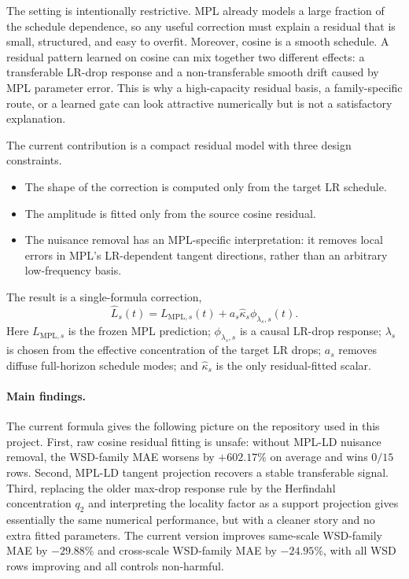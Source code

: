 \documentclass{article}
\newcommand{\MPL}{\mathrm{MPL}}
\begin{document}
The setting is intentionally restrictive.  MPL already models a large fraction of the
schedule dependence, so any useful correction must explain a residual that is small,
structured, and easy to overfit.  Moreover, cosine is a smooth schedule.  A residual pattern
learned on cosine can mix together two different effects: a transferable LR-drop response and
a non-transferable smooth drift caused by MPL parameter error.  This is why a high-capacity
residual basis, a family-specific route, or a learned gate can look attractive numerically but
is not a satisfactory explanation.

The current contribution is a compact residual model with three design constraints.
\begin{itemize}\itemsep2pt
  \item The shape of the correction is computed only from the target LR schedule.
  \item The amplitude is fitted only from the source cosine residual.
  \item The nuisance removal has an MPL-specific interpretation: it removes local errors in
  MPL's LR-dependent tangent directions, rather than an arbitrary low-frequency basis.
\end{itemize}

The result is a single-formula correction,
\begin{equation}\label{eq:main_law}
  \widehat L_s(t)=L_{\MPL,s}(t)+a_s\widehat\kappa_s\phi_{\lambda_s,s}(t).
\end{equation}
Here \(L_{\MPL,s}\) is the frozen MPL prediction; \(\phi_{\lambda_s,s}\) is a causal
LR-drop response; \(\lambda_s\) is chosen from the effective concentration of the target
LR drops; \(a_s\) removes diffuse full-horizon schedule modes; and \(\widehat\kappa_s\) is
the only residual-fitted scalar.

\paragraph{Main findings.}
The current formula gives the following picture on the repository used in this project.
First, raw cosine residual fitting is unsafe: without MPL-LD nuisance removal, the WSD-family
MAE worsens by \(+602.17\%\) on average and wins \(0/15\) rows.  Second, MPL-LD tangent
projection recovers a stable transferable signal.  Third, replacing the older max-drop
response rule by the Herfindahl concentration \(q_2\) and interpreting the locality factor as
a support projection gives essentially the same numerical performance, but with a cleaner
story and no extra fitted parameters.  The current version improves same-scale WSD-family
MAE by \(-29.88\%\) and cross-scale WSD-family MAE by \(-24.95\%\), with all WSD rows
improving and all controls non-harmful.
\end{document}
